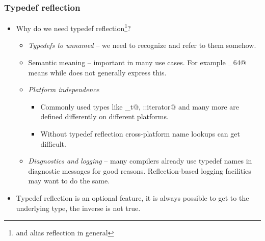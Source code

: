 \documentclass[compress,table,xcolor=table]{beamer}
\begin{document}
\begin{frame}[fragile]
\frametitle{Typedef reflection}
  \small
  \begin{itemize}
    \item Why do we need typedef reflection\footnote{and alias reflection
      in general}?
    \begin{itemize}
      \footnotesize
      \item {\em Typedefs to unnamed \verb@struct@s} -- we need to recognize
      and refer to them somehow.
      \item Semantic meaning -- important in many use cases. For example
        \verb@int_64@ means  while \verb@long@ does not generally
	express this.
      \item {\em Platform independence}
        \begin{itemize}
          \item Commonly used types like \verb@size_t@, \verb@string::iterator@
          and many more are defined differently on different platforms.
          \item Without typedef reflection cross-platform name
          lookups can get difficult.
        \end{itemize}
      \item {\em Diagnostics and logging} -- many compilers already use typedef
        names in diagnostic messages for good reasons. Reflection-based logging
        facilities may want to do the same.
    \end{itemize}
    \item Typedef reflection is an optional feature, it is always possible to get
      to the underlying type, the inverse is not true.
  \end{itemize}
\end{frame}
\end{document}
